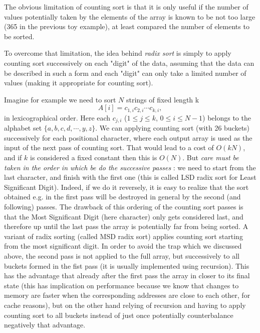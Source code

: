 \documentclass[12pt]{article}
\theoremstyle{plain}
\theoremstyle{remark}
\begin{document}
The obvious limitation of counting sort is that it is only useful if the
number of values potentially taken by the elements of the array is known to
be not too large (365 in the previous toy example), at least compared 
the number of elements to be sorted.


To overcome that limitation, the idea behind {\it radix sort} is simply to 
apply counting sort successively on each "digit" of the data, assuming that the
data can be described in such a form and each "digit" can only take a limited
number of values (making it appropriate for counting sort).

Imagine for example we need to sort $N$ strings of fixed length k 
$$
A[i] = c_{1,i}c_{2,i}\cdots c_{k,i},
$$
in lexicographical order. Here each $c_{j,i}$ ($1\leq j \leq k$, $0\leq i \leq N-1$) 
belongs to the alphabet set $\{a, b ,c ,d, \cdots, y, z\}$.
We can applying counting sort (with 26 buckets) successively for each positional 
character, where each output array is used as the input of the next pass of counting
sort. That would lead to a cost of $O(kN)$, and if $k$ is considered a fixed
constant then this is $O(N).$ But {\it care must be taken in the order in 
which be do the successive passes} : we need
to start from the last character, and finish with the first one (this is called 
LSD radix sort for Least Significant Digit). Indeed, if we do it reversely, it is
easy to realize that the sort obtained e.g. in the first pass will be destroyed
in general by the second (and following) passes. The drawback of this ordering
of the counting sort passes is that the Most Significant Digit (here character) 
only gets considered last, and therefore up until the last pass the array is
potentially far from being sorted. A variant of radix sorting (called MSD radix
sort) applies counting sort starting from the most significant digit. In order
to avoid the trap which we discussed above, the second pass is not applied to
the full array, but successively to all buckets formed in the fist pass (it is
usually implemented using recursion). This has the advantage that already after
the first pass the array in closer to its final state (this has implication on
performance because we know that changes to memory are faster when the
corresponding addresses are close to each other, for cache reasons), but on 
the other hand relying of recursion and having to apply counting sort to all 
buckets instead of just once potentially counterbalance negatively that
advantage.

\medskip
\end{document}
